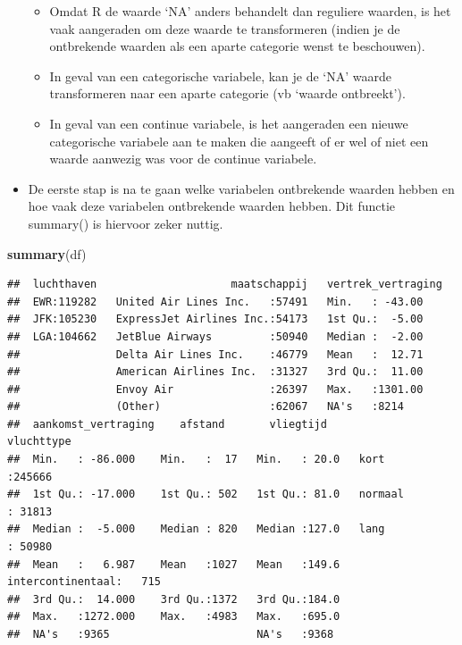 \documentclass[]{tufte-book}
\newenvironment{Shaded}{}{}
\newcommand{\KeywordTok}[1]{\textcolor[rgb]{0.00,0.44,0.13}{\textbf{#1}}}
\newcommand{\NormalTok}[1]{#1}
\providecommand{\tightlist}{%
  \setlength{\itemsep}{0pt}\setlength{\parskip}{0pt}}
\begin{document}
\begin{itemize}
  \begin{itemize}
  \tightlist
  \item
    Omdat R de waarde `NA' anders behandelt dan reguliere waarden, is het vaak aangeraden om deze waarde te transformeren (indien je de ontbrekende waarden als een aparte categorie wenst te beschouwen).
  \item
    In geval van een categorische variabele, kan je de `NA' waarde transformeren naar een aparte categorie (vb `waarde ontbreekt').
  \item
    In geval van een continue variabele, is het aangeraden een nieuwe categorische variabele aan te maken die aangeeft of er wel of niet een waarde aanwezig was voor de continue variabele.
  \end{itemize}
\item
  De eerste stap is na te gaan welke variabelen ontbrekende waarden hebben en hoe vaak deze variabelen ontbrekende waarden hebben. Dit functie summary() is hiervoor zeker nuttig.
\end{itemize}

\begin{Shaded}
\begin{Highlighting}[]
\KeywordTok{summary}\NormalTok{(df)}
\end{Highlighting}
\end{Shaded}

\begin{verbatim}
##  luchthaven                     maatschappij   vertrek_vertraging
##  EWR:119282   United Air Lines Inc.   :57491   Min.   : -43.00   
##  JFK:105230   ExpressJet Airlines Inc.:54173   1st Qu.:  -5.00   
##  LGA:104662   JetBlue Airways         :50940   Median :  -2.00   
##               Delta Air Lines Inc.    :46779   Mean   :  12.71   
##               American Airlines Inc.  :31327   3rd Qu.:  11.00   
##               Envoy Air               :26397   Max.   :1301.00   
##               (Other)                 :62067   NA's   :8214      
##  aankomst_vertraging    afstand       vliegtijd                 vluchttype    
##  Min.   : -86.000    Min.   :  17   Min.   : 20.0   kort             :245666  
##  1st Qu.: -17.000    1st Qu.: 502   1st Qu.: 81.0   normaal          : 31813  
##  Median :  -5.000    Median : 820   Median :127.0   lang             : 50980  
##  Mean   :   6.987    Mean   :1027   Mean   :149.6   intercontinentaal:   715  
##  3rd Qu.:  14.000    3rd Qu.:1372   3rd Qu.:184.0                             
##  Max.   :1272.000    Max.   :4983   Max.   :695.0                             
##  NA's   :9365                       NA's   :9368
\end{verbatim}
\end{document}
